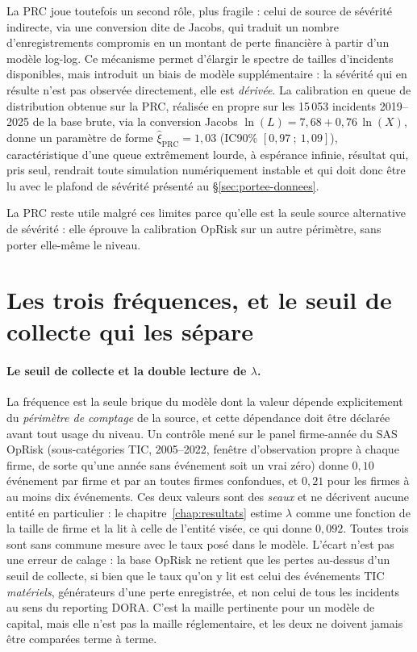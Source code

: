 La PRC joue toutefois un second rôle, plus fragile : celui de source de
sévérité indirecte, via une conversion dite de Jacobs, qui traduit un nombre
d'enregistrements compromis en un montant de perte financière à partir d'un
modèle log-log. Ce mécanisme permet d'élargir le spectre de tailles
d'incidents disponibles, mais introduit un biais de modèle supplémentaire :
la sévérité qui en résulte n'est pas observée directement, elle est
\emph{dérivée}. La calibration en queue de distribution obtenue sur la PRC,
réalisée en propre sur les 15\,053 incidents 2019--2025 de la base brute,
via la conversion Jacobs $\ln(L) = 7{,}68 + 0{,}76\,\ln(X)$, donne un
paramètre de forme $\hat{\xi}_{\text{PRC}} = 1{,}03$ (IC90\%
$[0{,}97~;~1{,}09]$), caractéristique d'une queue extrêmement lourde, à
espérance infinie, résultat qui, pris seul, rendrait toute simulation
numériquement instable et qui doit donc être lu avec le plafond de sévérité
présenté au \S\ref{sec:portee-donnees}.

La PRC reste utile malgré ces limites parce qu'elle est la seule source
alternative de sévérité : elle éprouve la calibration OpRisk sur un autre
périmètre, sans porter elle-même le niveau.


\section{Les trois fréquences, et le seuil de collecte qui les sépare}


\paragraph{Le seuil de collecte et la double lecture de $\lambda$.}
La fréquence est la seule brique du modèle dont la valeur dépende
explicitement du \emph{périmètre de comptage} de la source, et cette dépendance
doit être déclarée avant tout usage du niveau. Un contrôle mené sur le panel
firme-année du SAS OpRisk (sous-catégories TIC, 2005--2022, fenêtre
d'observation propre à chaque firme, de sorte qu'une année sans événement soit
un vrai zéro) donne $0{,}10$ événement par firme et par an toutes firmes
confondues, et $0{,}21$ pour les firmes à au moins dix événements. Ces deux
valeurs sont des \emph{seaux} et ne décrivent aucune entité en particulier : le
chapitre~\ref{chap:resultats} estime $\lambda$ comme une fonction de la taille de
firme et la lit à celle de l'entité visée, ce qui donne $0{,}092$. Toutes trois
sont sans commune mesure avec le taux posé dans le modèle. L'écart n'est pas une erreur de
calage : la base OpRisk ne retient que les pertes au-dessus d'un seuil
de collecte, si bien que le taux qu'on y lit est celui des événements TIC
\emph{matériels}, générateurs d'une perte enregistrée, et non celui de tous les
incidents au sens du reporting DORA. C'est la maille pertinente pour un modèle
de capital, mais elle n'est pas la maille réglementaire, et les deux ne doivent
jamais être comparées terme à terme.

